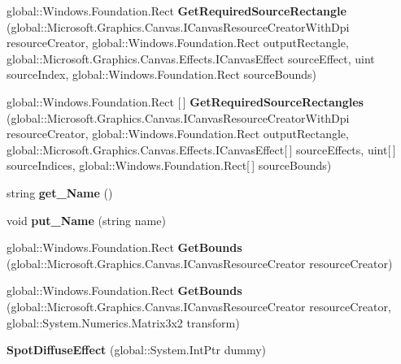 \begin{DoxyCompactItemize}
global\+::\+Windows.\+Foundation.\+Rect {\bfseries Get\+Required\+Source\+Rectangle} (global\+::\+Microsoft.\+Graphics.\+Canvas.\+I\+Canvas\+Resource\+Creator\+With\+Dpi resource\+Creator, global\+::\+Windows.\+Foundation.\+Rect output\+Rectangle, global\+::\+Microsoft.\+Graphics.\+Canvas.\+Effects.\+I\+Canvas\+Effect source\+Effect, uint source\+Index, global\+::\+Windows.\+Foundation.\+Rect source\+Bounds)
\item 
\mbox{\label{class_microsoft_1_1_graphics_1_1_canvas_1_1_effects_1_1_spot_diffuse_effect_ad890d06eb84dd2005acea03d4ac72d95}} 
global\+::\+Windows.\+Foundation.\+Rect \mbox{[}$\,$\mbox{]} {\bfseries Get\+Required\+Source\+Rectangles} (global\+::\+Microsoft.\+Graphics.\+Canvas.\+I\+Canvas\+Resource\+Creator\+With\+Dpi resource\+Creator, global\+::\+Windows.\+Foundation.\+Rect output\+Rectangle, global\+::\+Microsoft.\+Graphics.\+Canvas.\+Effects.\+I\+Canvas\+Effect\mbox{[}$\,$\mbox{]} source\+Effects, uint\mbox{[}$\,$\mbox{]} source\+Indices, global\+::\+Windows.\+Foundation.\+Rect\mbox{[}$\,$\mbox{]} source\+Bounds)
\item 
\mbox{\label{class_microsoft_1_1_graphics_1_1_canvas_1_1_effects_1_1_spot_diffuse_effect_a80017a8bc269e8b53be0237475f42fef}} 
string {\bfseries get\+\_\+\+Name} ()
\item 
\mbox{\label{class_microsoft_1_1_graphics_1_1_canvas_1_1_effects_1_1_spot_diffuse_effect_a84ad78cbbefa7d06bccedf8db81a069b}} 
void {\bfseries put\+\_\+\+Name} (string name)
\item 
\mbox{\label{class_microsoft_1_1_graphics_1_1_canvas_1_1_effects_1_1_spot_diffuse_effect_a69c0c17aa611778dd2e2b32293e37614}} 
global\+::\+Windows.\+Foundation.\+Rect {\bfseries Get\+Bounds} (global\+::\+Microsoft.\+Graphics.\+Canvas.\+I\+Canvas\+Resource\+Creator resource\+Creator)
\item 
\mbox{\label{class_microsoft_1_1_graphics_1_1_canvas_1_1_effects_1_1_spot_diffuse_effect_ac221cecc5ef487645395a4d4e165ea3d}} 
global\+::\+Windows.\+Foundation.\+Rect {\bfseries Get\+Bounds} (global\+::\+Microsoft.\+Graphics.\+Canvas.\+I\+Canvas\+Resource\+Creator resource\+Creator, global\+::\+System.\+Numerics.\+Matrix3x2 transform)
\item 
\mbox{\label{class_microsoft_1_1_graphics_1_1_canvas_1_1_effects_1_1_spot_diffuse_effect_a1793ac01d2b7fcfb4c8585ffa6e4fe3e}} 
{\bfseries Spot\+Diffuse\+Effect} (global\+::\+System.\+Int\+Ptr dummy)
\end{DoxyCompactItemize}


